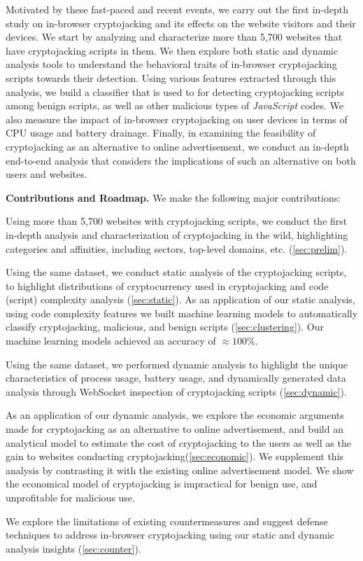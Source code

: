 \documentclass[acmlarge]{acmart}
\newcommand{\BfPara}[1]{{\noindent\bf#1.}\xspace\xspace}
\newcommand{\js}{{\em JavaScript}\xspace}
\newcommand{\cc}{{cryptocurrency}\xspace}
\newcommand{\cj}{cryptojacking\xspace}
\begin{document}
Motivated by these fast-paced and recent events, we carry out the first in-depth study on in-browser \cj and its effects on the website visitors and their devices. We start by analyzing and characterize more than 5,700 websites that have \cj scripts in them. We then explore both static and dynamic analysis tools to understand the behavioral traits of in-browser \cj scripts towards their detection. Using various features extracted through this analysis, we build a classifier that is used to for detecting \cj scripts among benign scripts, as well as other malicious types of \js codes. We also measure the impact of in-browser \cj on user devices in terms of CPU usage and battery drainage. Finally, in examining the feasibility of \cj as an alternative to online advertisement, we conduct an in-depth end-to-end analysis that considers the implications of such an alternative on both users and websites.




\BfPara{Contributions and Roadmap}
We make the following major contributions:
\begin{enumerate*}
    \item Using more than 5,700 websites with \cj scripts, we conduct the first in-depth analysis and characterization of \cj in the wild, highlighting categories and affinities, including sectors, top-level domains, etc. (\textsection\ref{sec:prelim}). 
    \item Using the same dataset, we conduct static analysis of the \cj scripts, to highlight distributions of \cc used in \cj and code (script) complexity analysis (\textsection\ref{sec:static}). As an application of our static analysis, using code complexity features we built machine learning models to automatically classify \cj, malicious, and benign scripts (\textsection\ref{sec:clustering}). Our machine learning models achieved an accuracy of $\approx100\%$. 
    \item Using the same dataset, we performed dynamic analysis to highlight the unique characteristics of process usage, battery usage, and dynamically generated data analysis through WebSocket inspection of \cj scripts (\textsection\ref{sec:dynamic}). 
    \item As an application of our dynamic analysis, we explore the economic arguments made for \cj as an alternative to online advertisement, and build an analytical model to estimate the cost of \cj to the users as well as the gain to websites conducting \cj (\textsection\ref{sec:economic}). We supplement this analysis by contrasting it with the existing online advertisement model. We show the economical model of \cj is impractical for benign use, and unprofitable for malicious use. 
    \item We explore the limitations of existing countermeasures and suggest defense techniques to address in-browser \cj using our static and dynamic analysis insights (\textsection\ref{sec:counter}). 
\end{enumerate*}
\end{document}
